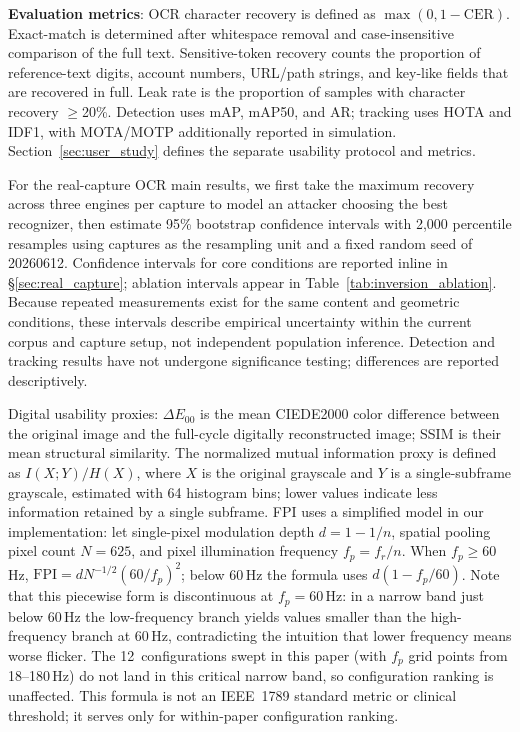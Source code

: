 \documentclass{ieeeaccess}
\begin{document}
\textbf{Evaluation metrics}: OCR character recovery is defined as $\max(0,1-\mathrm{CER})$. Exact-match is determined after whitespace removal and case-insensitive comparison of the full text. Sensitive-token recovery counts the proportion of reference-text digits, account numbers, URL/path strings, and key-like fields that are recovered in full. Leak rate is the proportion of samples with character recovery $\geq$20\%. Detection uses mAP, mAP50, and AR; tracking uses HOTA and IDF1, with MOTA/MOTP additionally reported in simulation. Section~\ref{sec:user_study} defines the separate usability protocol and metrics.

For the real-capture OCR main results, we first take the maximum recovery across three engines per capture to model an attacker choosing the best recognizer, then estimate 95\% bootstrap confidence intervals with 2,000 percentile resamples using captures as the resampling unit and a fixed random seed of 20260612. Confidence intervals for core conditions are reported inline in \S\ref{sec:real_capture}; ablation intervals appear in Table~\ref{tab:inversion_ablation}. Because repeated measurements exist for the same content and geometric conditions, these intervals describe empirical uncertainty within the current corpus and capture setup, not independent population inference. Detection and tracking results have not undergone significance testing; differences are reported descriptively.

Digital usability proxies: $\Delta E_{00}$ is the mean CIEDE2000 color difference between the original image and the full-cycle digitally reconstructed image; SSIM is their mean structural similarity. The normalized mutual information proxy is defined as $I(X;Y)/H(X)$, where $X$ is the original grayscale and $Y$ is a single-subframe grayscale, estimated with 64 histogram bins; lower values indicate less information retained by a single subframe. FPI uses a simplified model in our implementation: let single-pixel modulation depth $d=1-1/n$, spatial pooling pixel count $N=625$, and pixel illumination frequency $f_p=f_r/n$. When $f_p\geq60$\,Hz, $\mathrm{FPI}=dN^{-1/2}(60/f_p)^2$; below 60\,Hz the formula uses $d(1-f_p/60)$. Note that this piecewise form is discontinuous at $f_p=60$\,Hz: in a narrow band just below 60\,Hz the low-frequency branch yields values smaller than the high-frequency branch at 60\,Hz, contradicting the intuition that lower frequency means worse flicker. The 12~configurations swept in this paper (with $f_p$ grid points from 18--180\,Hz) do not land in this critical narrow band, so configuration ranking is unaffected. This formula is not an IEEE~1789 standard metric or clinical threshold; it serves only for within-paper configuration ranking.
\end{document}
